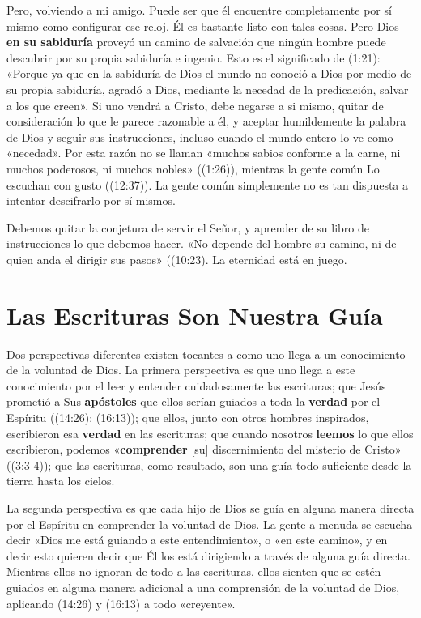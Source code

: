\documentclass[12pt, twoside, openright]{book}
\begin{document}
Pero, volviendo a mi amigo. Puede ser que él encuentre completamente por sí mismo como configurar ese reloj.  Él es bastante listo con tales cosas. Pero Dios \textbf{en su sabiduría} proveyó un camino de salvación que ningún hombre puede descubrir por su propia sabiduría e ingenio. Esto es el significado de (1:21): «Porque ya que en la sabiduría de Dios el mundo no conoció a Dios por medio de su propia sabiduría, agradó a Dios, mediante la necedad de la predicación, salvar a los que creen». Si uno vendrá a Cristo, debe negarse a si mismo, quitar de consideración lo que le parece razonable a él, y aceptar humildemente la palabra de Dios y seguir sus instrucciones, incluso cuando el mundo entero lo ve como «necedad». Por esta razón no se llaman «muchos sabios conforme a la carne, ni muchos poderosos, ni muchos nobles» ((1:26)), mientras la gente común Lo escuchan con gusto ((12:37)). La gente común simplemente no es tan dispuesta a intentar descifrarlo por sí mismos. 

Debemos quitar la conjetura de servir el Señor, y aprender de su libro de instrucciones lo que debemos hacer. «No depende del hombre su camino, ni de quien anda el dirigir sus pasos» ((10:23). La eternidad está en juego. 

\section{Las Escrituras Son Nuestra Guía}
Dos perspectivas diferentes existen tocantes a como uno llega a un conocimiento de la voluntad de Dios. La primera perspectiva es que uno llega a este conocimiento por el leer y entender cuidadosamente las escrituras; que Jesús prometió a Sus \textbf{apóstoles} que ellos serían guiados a toda la \textbf{verdad} por el Espíritu ((14:26); (16:13)); que ellos, junto con otros hombres inspirados, escribieron esa \textbf{verdad} en las escrituras; que cuando nosotros \textbf{leemos} lo que ellos escribieron, podemos «\textbf{comprender} [su] discernimiento del misterio de Cristo» ((3:3-4)); que las escrituras, como resultado, son una guía todo-suficiente desde la tierra hasta los cielos. 

La segunda perspectiva es que cada hijo de Dios se guía en alguna manera directa por el Espíritu en comprender la voluntad de Dios. La gente a menuda se escucha decir «Dios me está guiando a este entendimiento», o «en este camino», y en decir esto quieren decir que Él los está dirigiendo a través de alguna guía directa. Mientras ellos no ignoran de todo a las escrituras, ellos sienten que se estén guiados en alguna manera adicional a una comprensión de la voluntad de Dios, aplicando (14:26) y (16:13) a todo «creyente».
\end{document}
